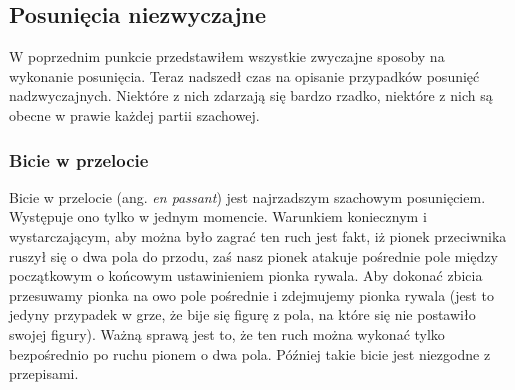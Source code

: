 \documentclass[12pt,leqno]{article}
\begin{document}
\subsection{Posunięcia niezwyczajne}
W poprzednim punkcie przedstawiłem wszystkie zwyczajne sposoby na wykonanie posunięcia. Teraz nadszedł czas na opisanie przypadków posunięć nadzwyczajnych. Niektóre z nich zdarzają się bardzo rzadko, niektóre z nich są obecne w prawie każdej partii szachowej.
\subsubsection{Bicie w przelocie}
Bicie w przelocie (ang. {\it en passant}) jest najrzadszym szachowym posunięciem. Występuje ono tylko w jednym momencie. Warunkiem koniecznym i wystarczającym, aby można było zagrać ten ruch jest fakt, iż pionek przeciwnika ruszył się o dwa pola do przodu, zaś nasz pionek atakuje pośrednie pole między początkowym o końcowym ustawinieniem pionka rywala. Aby dokonać zbicia przesuwamy pionka na owo pole pośrednie i zdejmujemy pionka rywala (jest to jedyny przypadek w grze, że bije się figurę z pola, na które się nie postawiło swojej figury). Ważną sprawą jest to, że ten ruch można wykonać tylko bezpośrednio po ruchu pionem o dwa pola. Później takie bicie jest niezgodne z przepisami.
\end{document}
